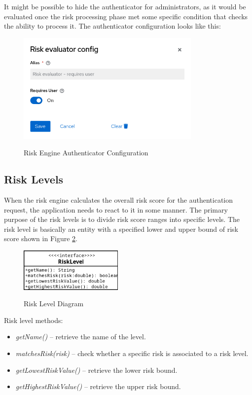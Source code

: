 It might be possible to hide the authenticator for administrators, as it would be evaluated once the risk processing phase met some specific condition that checks the ability to process it.
\newline
\newline
The authenticator configuration looks like this:

\begin{figure}[htbp]
  \centering
  \includegraphics[width=0.8\textwidth]{img/sections/5-design/risk-evaluator-authenticator-config.png}
  \label{fig:risk-evaluator-authenticator-config}
  \caption{Risk Engine Authenticator Configuration}
\end{figure}

\subsection{Risk Levels} \label{risk-levels}
When the risk engine calculates the overall risk score for the authentication request, the application needs to react to it in some manner.
The primary purpose of the risk levels is to divide risk score ranges into specific levels.
The risk level is basically an entity with a specified lower and upper bound of risk score shown in Figure \ref{fig:risk-level-diagram}.

\begin{figure}[htbp]
  \centering
  \includegraphics[width=0.45\textwidth]{img/sections/5-design/risk-level.png}
  \label{fig:risk-level-diagram}
  \caption{Risk Level Diagram}
\end{figure}

Risk level methods:
\begin{itemize}
    \item \textit{getName()} -- retrieve the name of the level.
    \item \textit{matchesRisk(risk)} -- check whether a specific risk is associated to a risk level.
    \item \textit{getLowestRiskValue()} -- retrieve the lower risk bound.
    \item \textit{getHighestRiskValue()} -- retrieve the upper risk bound.
\end{itemize}

